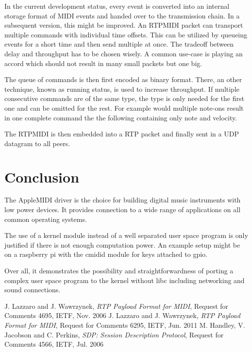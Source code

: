 \documentclass[paper=a4,fontsize=11pt,twocolumn,pagesize,bibtotoc]{scrartcl}
\begin{document}
	In the current development status, every event is converted into an internal storage format of MIDI events and handed over to the transmission chain. In a subsequent version, this might be improved. An RTPMIDI packet can transport multiple commands with individual time offsets. This can be utilized by queueing events for a short time and then send multiple at once. The tradeoff between delay and throughput has to be chosen wisely. A common use-case is playing an accord which should not result in many small packets but one big.
	
	The queue of commands is then first encoded as binary format. There, an other technique, known as running status, is used to increase throughput. If multiple consecutive commands are of the same type, the type is only needed for the first one and can be omitted for the rest. For example would multiple note-ons result in one complete command the the following containing only note and velocity.
	
	The RTPMIDI is then embedded into a RTP packet and finally sent in a UDP datagram to all peers.
	
	
	\section{Conclusion}
	
	The AppleMIDI driver is the choice for building digital music instruments with low power devices. It provides connection to a wide range of applications on all common operating systems.
	
	The use of a kernel module instead of a well separated user space program is only justified if there is not enough computation power. An example setup might be on a raspberry pi with the cmidid module for keys attached to gpio.
	
	Over all, it demonstrates the possibility and straightforwardness of porting a complex user space program to the kernel without libc including networking and sound connections.
	 
	
	\begin{thebibliography}{99}
	
	
	 J. Lazzaro and J. Wawrzynek, \emph{RTP Payload Format for MIDI}, Request for Comments 4695, IETF, Nov. 2006
	 J. Lazzaro and J. Wawrzynek, \emph{RTP Payload Format for MIDI}, Request for Comments 6295, IETF, Jun. 2011
	 M. Handley, V. Jacobson and C. Perkins, \emph{SDP: Session Description Protocol}, Request for Comments 4566, IETF, Jul. 2006
	
	\end{thebibliography}
	
	
\end{document}
